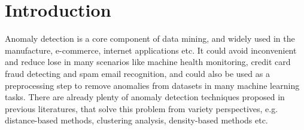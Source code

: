 \chapter{Introduction}
\label{chap:Introduction}

Anomaly detection is a core component of data mining, and widely used in the manufacture, e-commerce, internet applications etc. It could avoid inconvenient and reduce lose in many scenarios like machine health monitoring, credit card fraud detecting and spam email recognition, and could also be used as a preprocessing step to remove anomalies from datasets in many machine learning tasks. There are already plenty of anomaly detection techniques proposed in previous literatures, that solve this problem from variety perspectives, e.g. distance-based methods, clustering analysis, density-based methods etc.\\

